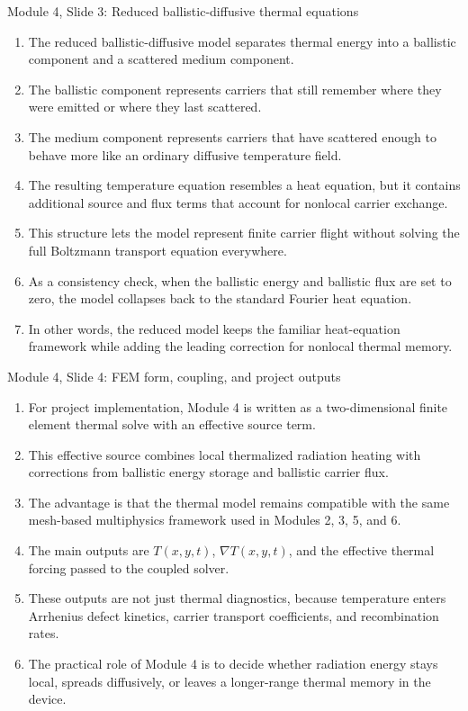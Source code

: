 \documentclass[11pt]{article}
\begin{document}
\begin{slidebox}{Module 4, Slide 3: Reduced ballistic-diffusive thermal equations}
\begin{enumerate}
\item The reduced ballistic-diffusive model separates thermal energy into a ballistic component and a scattered medium component.
\item The ballistic component represents carriers that still remember where they were emitted or where they last scattered.
\item The medium component represents carriers that have scattered enough to behave more like an ordinary diffusive temperature field.
\item The resulting temperature equation resembles a heat equation, but it contains additional source and flux terms that account for nonlocal carrier exchange.
\item This structure lets the model represent finite carrier flight without solving the full Boltzmann transport equation everywhere.
\item As a consistency check, when the ballistic energy and ballistic flux are set to zero, the model collapses back to the standard Fourier heat equation.
\item In other words, the reduced model keeps the familiar heat-equation framework while adding the leading correction for nonlocal thermal memory.
\end{enumerate}
\end{slidebox}

\begin{slidebox}{Module 4, Slide 4: FEM form, coupling, and project outputs}
\begin{enumerate}
\item For project implementation, Module 4 is written as a two-dimensional finite element thermal solve with an effective source term.
\item This effective source combines local thermalized radiation heating with corrections from ballistic energy storage and ballistic carrier flux.
\item The advantage is that the thermal model remains compatible with the same mesh-based multiphysics framework used in Modules 2, 3, 5, and 6.
\item The main outputs are \(T(x,y,t)\), \(\nabla T(x,y,t)\), and the effective thermal forcing passed to the coupled solver.
\item These outputs are not just thermal diagnostics, because temperature enters Arrhenius defect kinetics, carrier transport coefficients, and recombination rates.
\item The practical role of Module 4 is to decide whether radiation energy stays local, spreads diffusively, or leaves a longer-range thermal memory in the device.
\end{enumerate}
\end{slidebox}
\end{document}
